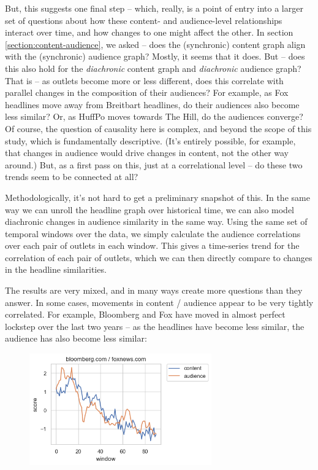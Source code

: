 \documentclass{scrartcl}
\begin{document}
But, this suggests one final step -- which, really, is a point of entry into a larger set of questions about how these content- and audience-level relationships interact over time, and how changes to one might affect the other. In section \ref{section:content-audience}, we asked -- does the (synchronic) content graph align with the (synchronic) audience graph? Mostly, it seems that it does. But -- does this also hold for the \textit{diachronic} content graph and \textit{diachronic} audience graph? That is -- as outlets become more or less different, does this correlate with parallel changes in the composition of their audiences? For example, as Fox headlines move away from Breitbart headlines, do their audiences also become less similar? Or, as HuffPo moves towards The Hill, do the audiences converge? Of course, the question of causality here is complex, and beyond the scope of this study, which is fundamentally descriptive.  (It's entirely possible, for example, that changes in audience would drive changes in content, not the other way around.) But, as a first pass on this, just at a correlational level -- do these two trends seem to be connected at all?

Methodologically, it's not hard to get a preliminary snapshot of this. In the same way we can unroll the headline graph over historical time, we can also model diachronic changes in audience similarity in the same way. Using the same set of temporal windows over the data, we simply calculate the audience correlations over each pair of outlets in each window. This gives a time-series trend for the correlation of each pair of outlets, which we can then directly compare to changes in the headline similarities.

The results are very mixed, and in many ways create more questions than they answer. In some cases, movements in content / audience appear to be very tightly correlated. For example, Bloomberg and Fox have moved in almost perfect lockstep over the last two years -- as the headlines have become less similar, the audience has also become less similar:

\begin{figure}[H]
  \centering
  \includegraphics[width=0.7\textwidth]{figures/bloomberg-fox-corr.png}
\end{figure}
\end{document}
